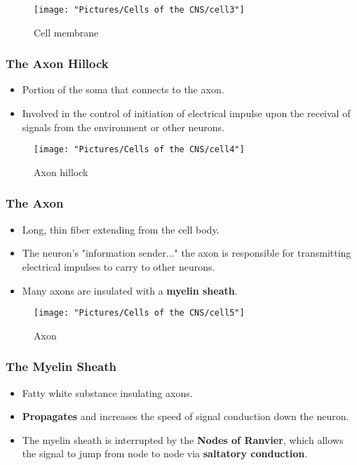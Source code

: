 \documentclass[12pt,a4paper]{article}
\begin{document}
	
\begin{figure}
	\centering
	\texttt{[image: "Pictures/Cells of the CNS/cell3"]}
	\caption{Cell membrane}
	\label{fig:cell3}
\end{figure}
	
	\subsubsection{The Axon Hillock}
	
	\begin{itemize}
		\item Portion of the soma that connects to the axon. 
		\item Involved in the control of initiation of electrical impulse upon the receival of signals from the environment or other neurons. 
	\end{itemize}
	
	
\begin{figure}
	\centering
	\texttt{[image: "Pictures/Cells of the CNS/cell4"]}
	\caption{Axon hillock}
	\label{fig:cell4}
\end{figure}
	
	\subsubsection{The Axon}
	\begin{itemize}
	\item Long, thin fiber extending from the cell body. 
	\item The neuron's "information sender..." the axon is responsible for transmitting electrical impulses to carry to other neurons. 
	\item Many axons are insulated with a \textbf{myelin sheath}.  
	\end{itemize}
	
	
\begin{figure}
	\centering
	\texttt{[image: "Pictures/Cells of the CNS/cell5"]}
	\caption{Axon}
	\label{fig:cell5}
\end{figure}
	
	\subsubsection{The Myelin Sheath}
	
	\begin{itemize}
		\item Fatty white substance insulating axons. 
		\item \textbf{Propagates} and increases the speed of signal conduction down the neuron. 
		\item The myelin sheath is interrupted by the \textbf{Nodes of Ranvier}, which allows the signal to jump from node to node via \textbf{saltatory conduction}. 
	\end{itemize}
	
\end{document}
